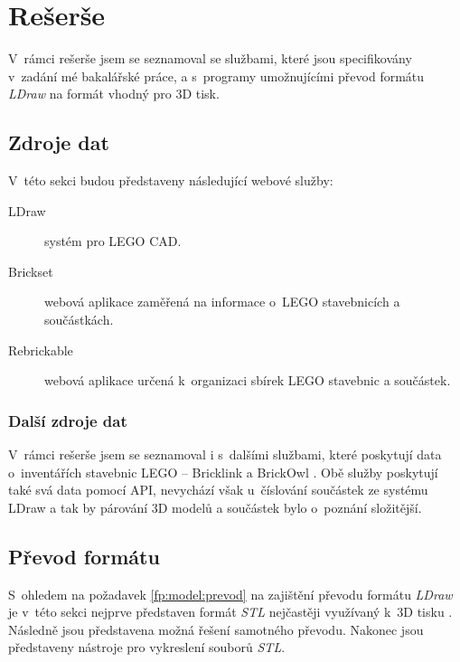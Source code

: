 \chapter{Rešerše}
V~rámci rešerše jsem se seznamoval se službami, které jsou specifikovány v~zadání mé bakalářské práce, a s~programy umožnujícími převod formátu \textit{LDraw} na formát vhodný pro 3D tisk.


\section{Zdroje dat}  

V~této sekci budou představeny následující webové služby:
\begin{description}
  \item[LDraw] systém pro LEGO \gls{CAD}.
  \item[Brickset] webová aplikace zaměřená na informace o~LEGO stavebnicích a součástkách.
  \item[Rebrickable] webová aplikace určená k~organizaci sbírek LEGO stavebnic a součástek.
\end{description}




\subsection{Další zdroje dat}
V~rámci rešerše jsem se seznamoval i s~dalšími službami, které poskytují data o~inventářích stavebnic LEGO – Bricklink \autocite{bricklink} a BrickOwl \autocite{brickowl}. Obě služby poskytují také svá data pomocí \gls{API}, nevychází však u~číslování součástek ze systému LDraw a tak by párování 3D modelů a součástek bylo o~poznání složitější. 

\section{Převod formátu}
S~ohledem na požadavek \ref{fp:model:prevod} na zajištění převodu formátu \textit{LDraw} je v~této sekci nejprve představen formát \textit{\gls{STL}} nejčastěji využívaný k~3D tisku \autocite{3DAddFab}. Následně jsou představena možná řešení samotného převodu. Nakonec jsou představeny nástroje pro vykreslení souborů \textit{STL}.






